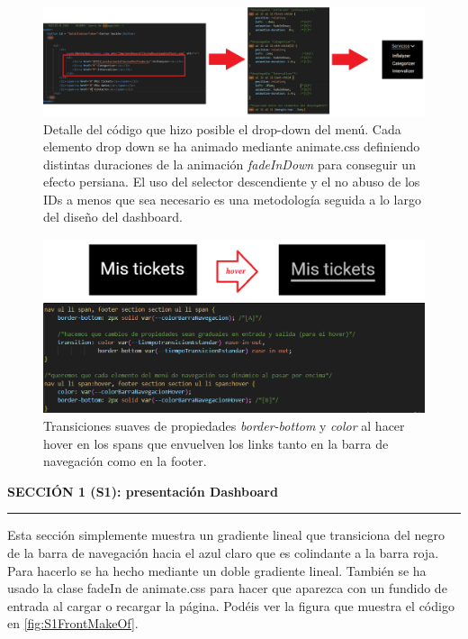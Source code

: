 \documentclass[a4paper,12pt]{report}
\begin{document}
	
	\FloatBarrier
	\setlength{\belowcaptionskip}{0pt}
	\begin{figure}[H]
		\centering
		\caption{Detalle del código que hizo posible el drop-down del menú. Cada elemento drop down se ha animado mediante animate.css definiendo distintas duraciones de la animación \textit{fadeInDown} para conseguir un efecto persiana. El uso del selector descendiente y el no abuso de los IDs a menos que sea necesario es una metodología seguida a lo largo del diseño del dashboard.}
		\includegraphics[width=1\linewidth]{img/navBarDesplegadaMakingOfPermisos1.png}

		\label{fig:detalleNavbarDesplegadaCodi}
	\end{figure}
	\FloatBarrier
	
	\FloatBarrier
	\begin{figure}[H]
		\centering
		\caption{Transiciones suaves de propiedades \textit{border-bottom }y \textit{color} al hacer hover en los spans que envuelven los links tanto en la barra de navegación como en la footer.}
		\includegraphics[width=1\linewidth]{img/linkAhover.png}
		
		\label{fig:linkAhover}
	\end{figure}
	\FloatBarrier
	
	
	
	
	
	
	
	
	\noindent \textbf{SECCIÓN 1 (S1): presentación Dashboard}
	\hrule
	\vspace{.5em}
	
	Esta sección simplemente muestra un gradiente lineal que transiciona del negro de la barra de navegación hacia el azul claro que es colindante a la barra roja. Para hacerlo se ha hecho mediante un doble gradiente lineal. También se ha usado la clase fadeIn de animate.css para hacer que aparezca con un fundido de entrada al cargar o recargar la página. Podéis ver la figura que muestra el código en \ref{fig:S1FrontMakeOf}.
	
\end{document}
